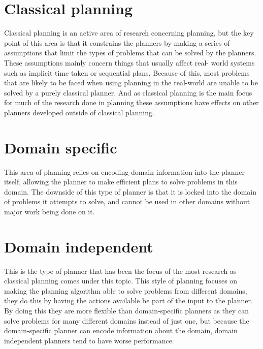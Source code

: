 \section{Classical planning}
Classical planning is an active area of research concerning planning, but the
key point of this area is that it constrains the planners by making a series of
assumptions that limit the types of problems that can be solved by the planners.
These assumptions mainly concern things that usually affect real- world systems
such as implicit time taken or sequential plans. Because of this, most problems
that are likely to be faced when using planning in the real-world are unable to
be solved by a purely classical planner. And as classical planning is the main
focus for much of the research done in planning these assumptions have effects
on other planners developed outside of classical planning.

\section{Domain specific}
This area of planning relies on encoding domain information into the planner
itself, allowing the planner to make efficient plans to solve problems in this
domain. The downside of this type of planner is that it is locked into the
domain of problems it attempts to solve, and cannot be used in other domains
without major work being done on it.

\section{Domain independent}
This is the type of planner that has been the focus of the most research as
classical planning comes under this topic. This style of planning focuses on
making the planning algorithm able to solve problems from different domains,
they do this by having the actions available be part of the input to the
planner. By doing this they are more flexible than domain-specific planners as
they can solve problems for many different domains instead of just one, but
because the domain-specific planner can encode information about the domain,
domain independent planners tend to have worse performance.

